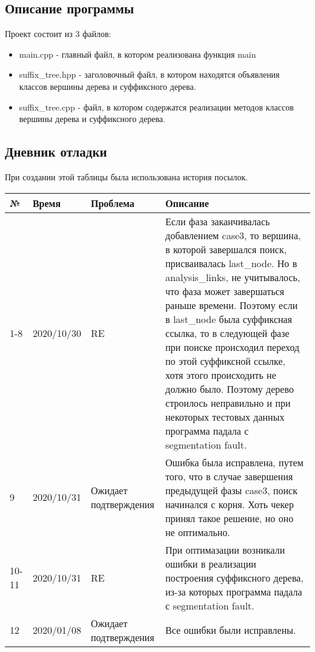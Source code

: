 \documentclass[12pt]{article}
\begin{document}
\subsection*{Описание программы}

Проект состоит из 3 файлов:
\begin{itemize}
    \item main.cpp - главный файл, в котором реализована функция main
    \item suffix\_tree.hpp - заголовочный файл, в котором находятся объявления классов вершины дерева и суффиксного дерева.
    \item suffix\_tree.cpp - файл, в котором содержатся реализации методов классов вершины дерева и суффиксного дерева.
\end{itemize}
\newpage
\subsection*{Дневник отладки}

При создании этой таблицы была использована история посылок.
\begin{table}[!htb]
\begin{tabular}{|m{2cm}|m{2cm}|m{3cm}|m{9cm}|}
\hline
№ & Время & Проблема & Описание \\
\hline
1-8 & 2020/10/30 & RE & Если фаза заканчивалась добавлением case3, то вершина, в которой завершался поиск, присваивалась last\_node. Но в analysis\_links, не учитывалось, что фаза может завершаться раньше времени. Поэтому если в last\_node была суффиксная ссылка, то в следующей фазе при поиске происходил переход по этой суффиксной ссылке, хотя этого происходить не должно было. Поэтому дерево строилось неправильно и при некоторых тестовых данных программа падала с segmentation fault. \\
\hline
9 & 2020/10/31 & Ожидает подтверждения & Ошибка была исправлена, путем того, что в случае завершения предыдущей фазы case3, поиск начинался с корня. Хоть чекер принял такое решение, но оно не оптимально. \\
\hline
10-11 & 2020/10/31 & RE & При оптимазации возникали ошибки в реализации построения суффиксного дерева, из-за которых программа падала с segmentation fault. \\
\hline
12 & 2020/01/08 & Ожидает подтверждения & Все ошибки были исправлены. \\
\hline
\end{tabular}
\end{table}
\end{document}
